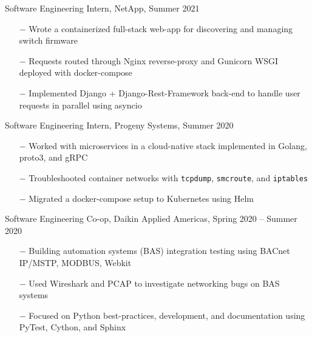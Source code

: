 \documentclass{article}
\newcommand{\code}[1]{\texttt{#1}} %
\begin{document}
{\setlength{\leftskip}{15pt}

{\selectfont Software Engineering Intern, NetApp, Summer 2021}
\vspace{-5pt}
\begin{itemize}
	\setlength{\leftskip}{15pt}
	\setlength\itemsep{-0.5em}
	\item[$-$] Wrote a containerized full-stack web-app for discovering and managing switch firmware
	\item[$-$] Requests routed through Nginx reverse-proxy and Gunicorn WSGI deployed with docker-compose
	\item[$-$] Implemented Django + Django-Rest-Framework back-end to handle user requests in parallel using asyncio
\end{itemize}


{\selectfont Software Engineering Intern, Progeny Systems, Summer 2020}
\vspace{-5pt}
\begin{itemize}
	\setlength{\leftskip}{15pt}
	\setlength\itemsep{-0.5em}
	\item[$-$] Worked with microservices in a cloud-native stack implemented in Golang, proto3, and gRPC 
	\item[$-$] Troubleshooted container networks with \code{tcpdump}, \code{smcroute}, and \code{iptables}
	\item[$-$] Migrated a docker-compose setup to Kubernetes using Helm
\end{itemize}


{\selectfont Software Engineering Co-op, Daikin Applied Americas, Spring 2020 – Summer 2020}
\vspace{-5pt}
\begin{itemize}
	\setlength{\leftskip}{15pt}
	\setlength\itemsep{-0.5em}
	\item[$-$] Building automation systems (BAS) integration testing using BACnet IP/MSTP, MODBUS, Webkit 
	\item[$-$] Used Wireshark and PCAP to investigate networking bugs on BAS systems
	\item[$-$] Focused on Python best-practices, development, and documentation using PyTest, Cython, and Sphinx
\end{itemize}


}
\end{document}
